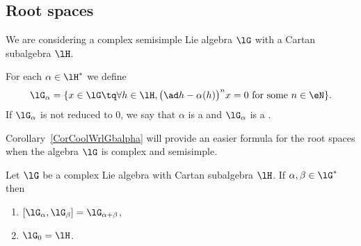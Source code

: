 \subsection{Root spaces}

We are considering a complex semisimple Lie algebra \( \lG\) with a Cartan subalgebra \( \lH\).

\begin{definition}      \label{DefRootSpace}
    For each \( \alpha\in\lH^*\) we define
    \begin{equation}            \label{eq:lG_alpha_nss}
        \lG_{\alpha}=\{  x\in\lG\tq\forall h\in\lH, \big(\ad h-\alpha(h)\big)^nx=0\text{ for some }n\in\eN    \}.
    \end{equation}
    If \( \lG_{\alpha}\) is not reduced to \( 0\), we say that \( \alpha\) is a  and \( \lG_{\alpha}\) is a .
\end{definition}
Corollary~\ref{CorCoolWrlGbalpha} will provide an easier formula for the root spaces when the algebra \( \lG\) is complex and semisimple.
\begin{theorem}     \label{TholGCartalphaplusbeta}
Let $\lG$ be a complex Lie algebra with Cartan subalgebra $\lH$. If $\alpha,\beta\in\lG^*$ then
\begin{enumerate}
    \item   \label{ItemTholGCartalphaplusbetai}
    $[\lG_{\alpha},\lG_{\beta}]=\lG_{\alpha+\beta}$,
\item $\lG_0=\lH$.
\end{enumerate}
\label{prop:deux_racine}
\end{theorem}

